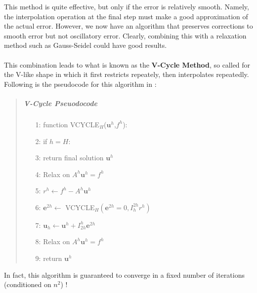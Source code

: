 This method is quite effective, but only if the error is relatively smooth. Namely, the interpolation operation at the final step must make a good approximation of the actual error. However, we now have an algorithm that preserves corrections to smooth error but not oscillatory error. Clearly, combining this with a relaxation method such as Gauss-Seidel could have good results.
\\\\
This combination leads to what is known as the \textbf{V-Cycle Method}, so called for the V-like shape in which it first restricts repeately, then interpolates repeatedly. Following is the pseudocode for this algorithm in \cite{lee14}:
\vspace{-.2in}
\begin{quote}
\item
\subparagraph{V-Cycle Pseuodocode}
\begin{enumerate}
\item[1:] function VCYCLE$_H$($\textbf{u}^h$,$f^h$):
\item[2:] \hspace{.2in} if $h=H$:
\item[3:] \hspace{.4in} return final solution $\textbf{u}^h$
\item[4:] \hspace{.2in} Relax on $A^h\textbf{u}^h=f^h$
\item[5:] \hspace{.2in} $r^{h}\leftarrow f^h-
						A^h\textbf{u}^h$
\item[6:] \hspace{.2in} $\textbf{e}^{2h}\leftarrow$
						VCYCLE$_H(\textbf{e}^{2h}=0,
						I_h^{2h}r^h)$
\item[7:] \hspace{.2in} $\textbf{u}_h\leftarrow
						\textbf{u}^h+I_{2h}^h
						\textbf{e}^{2h}$
\item[8:] \hspace{.2in} Relax on $A^h\textbf{u}^h=f^h$
\item[9:] \hspace{.2in} return $\textbf{u}^h$
\end{enumerate}
\end{quote}
In fact, this algorithm is guaranteed to converge in a fixed number of iterations (conditioned on $n^2$) \cite{gopal08}!